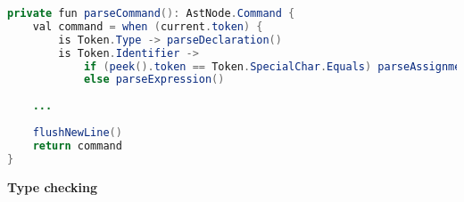\begin{lstlisting}[language=java,label=lis:parseCommand,caption=A simplified version of the parse declaration method from the parser.]
private fun parseCommand(): AstNode.Command {
    val command = when (current.token) {
	    is Token.Type -> parseDeclaration()
	    is Token.Identifier ->
		    if (peek().token == Token.SpecialChar.Equals) parseAssignment() 
		    else parseExpression()
    
    ...
    
    flushNewLine()
    return command
}
\end{lstlisting}

\textbf{Type checking}

